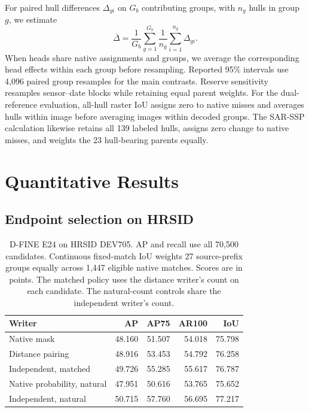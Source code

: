 For paired hull differences \(\Delta_{gi}\) on \(G_b\) contributing groups, with \(n_g\) hulls in group \(g\), we estimate
\begin{equation}
 \overline{\Delta}
 =\frac{1}{G_b}\sum_{g=1}^{G_b}\frac{1}{n_g}
  \sum_{i=1}^{n_g}\Delta_{gi}.
 \label{eq:paired-acquisition-effect}
\end{equation}
When heads share native assignments and groups, we average the corresponding head effects within each group before resampling. Reported 95\% intervals use 4,096 paired group resamples for the main contrasts. Reserve sensitivity resamples sensor--date blocks while retaining equal parent weights. For the dual-reference evaluation, all-hull raster IoU assigns zero to native misses and averages hulls within image before averaging images within decoded groups. The SAR-SSP calculation likewise retains all 139 labeled hulls, assigns zero change to native misses, and weights the 23 hull-bearing parents equally.

\section{Quantitative Results}
\label{sec:quantitative}

\subsection{Endpoint selection on HRSID}
\begin{table}[t]
 \caption{D-FINE E24 on HRSID DEV705. AP and recall use all 70,500 candidates. Continuous fixed-match IoU weights 27 source-prefix groups equally across 1,447 eligible native matches. Scores are in points. The matched policy uses the distance writer's count on each candidate. The natural-count controls share the independent writer's count.}
 \label{tab:dev}
 \centering\footnotesize
 \setlength{\tabcolsep}{3pt}
 \begin{tabular}{@{}lrrrr@{}}
 \toprule
 Writer & AP & AP75 & AR100 & IoU\\
 \midrule
 Native mask & 48.160 & 51.507 & 54.018 & 75.798\\
 Distance pairing & 48.916 & 53.453 & 54.792 & 76.258\\
 Independent, matched & 49.726 & 55.285 & 55.617 & 76.787\\
 Native probability, natural & 47.951 & 50.616 & 53.765 & 75.652\\
 Independent, natural & 50.715 & 57.760 & 56.695 & 77.217\\
 \bottomrule
 \end{tabular}
\end{table}


